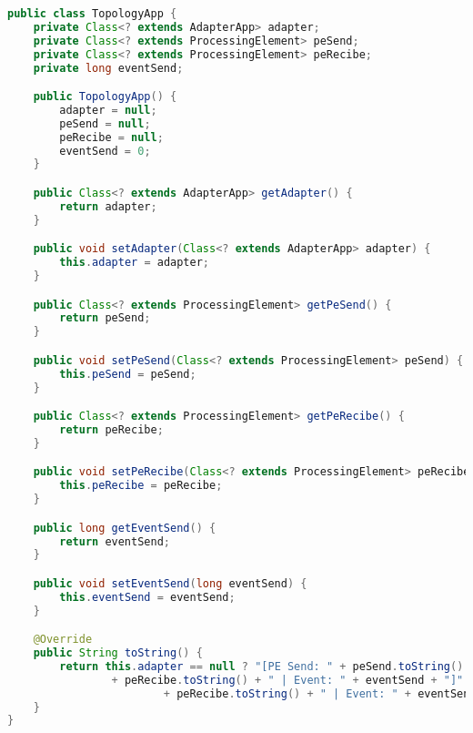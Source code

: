 \begin{lstlisting}[caption={Clase TopologyApp, el cual contiene las topología del grafo diseñado por el usuario.},label={lst:topologyApp},language=Java]
public class TopologyApp {
	private Class<? extends AdapterApp> adapter;
	private Class<? extends ProcessingElement> peSend;
	private Class<? extends ProcessingElement> peRecibe;
	private long eventSend;

	public TopologyApp() {
		adapter = null;
		peSend = null;
		peRecibe = null;
		eventSend = 0;
	}

	public Class<? extends AdapterApp> getAdapter() {
		return adapter;
	}

	public void setAdapter(Class<? extends AdapterApp> adapter) {
		this.adapter = adapter;
	}

	public Class<? extends ProcessingElement> getPeSend() {
		return peSend;
	}

	public void setPeSend(Class<? extends ProcessingElement> peSend) {
		this.peSend = peSend;
	}

	public Class<? extends ProcessingElement> getPeRecibe() {
		return peRecibe;
	}

	public void setPeRecibe(Class<? extends ProcessingElement> peRecibe) {
		this.peRecibe = peRecibe;
	}

	public long getEventSend() {
		return eventSend;
	}

	public void setEventSend(long eventSend) {
		this.eventSend = eventSend;
	}

	@Override
	public String toString() {
		return this.adapter == null ? "[PE Send: " + peSend.toString() + " | PE Recibe: "
				+ peRecibe.toString() + " | Event: " + eventSend + "]" : "[Adapter: " + adapter.toString() + " | PE Recibe: "
						+ peRecibe.toString() + " | Event: " + eventSend + "]";
	}
}
\end{lstlisting}